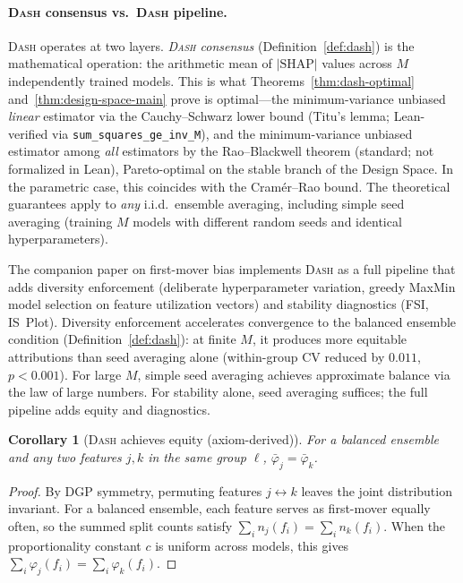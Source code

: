 \documentclass{article}
\newtheorem{corollary}[theorem]{Corollary}
\newcommand{\DASH}{\textsc{Dash}}
\begin{document}
\paragraph{\DASH{} consensus vs.\ \DASH{} pipeline.}
\DASH{} operates at two layers. \emph{\DASH{} consensus} (Definition~\ref{def:dash}) is the mathematical operation: the arithmetic mean of $|\text{SHAP}|$ values across $M$ independently trained models. This is what Theorems~\ref{thm:dash-optimal} and~\ref{thm:design-space-main} prove is optimal---the minimum-variance unbiased \emph{linear} estimator via the Cauchy--Schwarz lower bound (Titu's lemma; Lean-verified via \texttt{sum\_squares\_ge\_inv\_M}), and the minimum-variance unbiased estimator among \emph{all} estimators by the Rao--Blackwell theorem (standard; not formalized in Lean), Pareto-optimal on the stable branch of the Design Space. In the parametric case, this coincides with the Cram\'er--Rao bound. The theoretical guarantees apply to \emph{any} i.i.d.\ ensemble averaging, including simple seed averaging (training $M$ models with different random seeds and identical hyperparameters).

The companion paper on first-mover bias implements \DASH{} as a full pipeline that adds diversity enforcement (deliberate hyperparameter variation, greedy MaxMin model selection on feature utilization vectors) and stability diagnostics (FSI, IS~Plot). Diversity enforcement accelerates convergence to the balanced ensemble condition (Definition~\ref{def:dash}): at finite $M$, it produces more equitable attributions than seed averaging alone (within-group CV reduced by $0.011$, $p < 0.001$). For large $M$, simple seed averaging achieves approximate balance via the law of large numbers. For stability alone, seed averaging suffices; the full pipeline adds equity and diagnostics.

\begin{corollary}[\DASH{} achieves equity (axiom-derived)]
\label{cor:equity}
For a balanced ensemble and any two features $j, k$ in the same group $\ell$, $\bar{\varphi}_j = \bar{\varphi}_k$.
\end{corollary}

\begin{proof}
By DGP symmetry, permuting features $j \leftrightarrow k$ leaves the joint distribution invariant. For a balanced ensemble, each feature serves as first-mover equally often, so the summed split counts satisfy $\sum_i n_j(f_i) = \sum_i n_k(f_i)$. When the proportionality constant $c$ is uniform across models, this gives $\sum_i \varphi_j(f_i) = \sum_i \varphi_k(f_i)$.
\end{proof}
\end{document}
